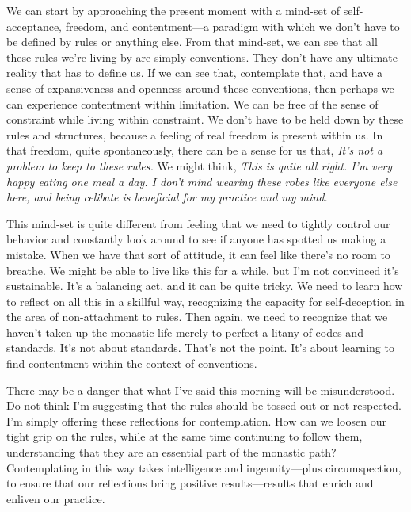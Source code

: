 We can start by approaching the present moment with a mind-set of 
self-acceptance, freedom, and contentment---a paradigm with which we 
don't have to be defined by rules or anything else. From that mind-set, 
we can see that all these rules we're living by are simply conventions. 
They don't have any ultimate reality that has to define us. If we can 
see that, contemplate that, and have a sense of expansiveness and 
openness around these conventions, then perhaps we can experience 
contentment within limitation. We can be free of the sense of 
constraint while living within constraint. We don't have to be held 
down by these rules and structures, because a feeling of real freedom 
is present within us. In that freedom, quite spontaneously, there can 
be a sense for us that, \emph{It's not a problem to keep to these 
rules.} We might think, \emph{This is quite all right. I'm very happy 
eating one meal a day. I don't mind wearing these robes like everyone 
else here, and being celibate is beneficial for my practice and my 
mind.}

This mind-set is quite different from feeling that we need to tightly 
control our behavior and constantly look around to see if anyone has 
spotted us making a mistake. When we have that sort of attitude, it can 
feel like there's no room to breathe. We might be able to live like 
this for a while, but I'm not convinced it's sustainable. It's a 
balancing act, and it can be quite tricky. We need to learn how to 
reflect on all this in a skillful way, recognizing the capacity for 
self-deception in the area of non-attachment to rules. Then again, we 
need to recognize that we haven't taken up the monastic life merely to 
perfect a litany of codes and standards. It's not about standards. 
That's not the point. It's about learning to find contentment within 
the context of conventions.

There may be a danger that what I've said this morning will be 
misunderstood. Do not think I'm suggesting that the rules should be 
tossed out or not respected. I'm simply offering these reflections for 
contemplation. How can we loosen our tight grip on the rules, while at 
the same time continuing to follow them, understanding that they are an 
essential part of the monastic path? Contemplating in this way takes 
intelligence and ingenuity---plus circumspection, to ensure that our 
reflections bring positive results---results that enrich and enliven 
our practice.


